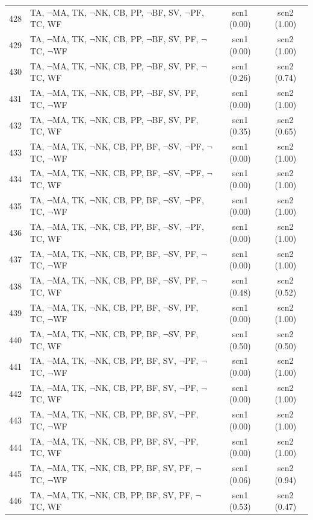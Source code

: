 \documentclass[12pt]{article}
\begin{document}
\begin{longtable}{|l|l|c|c|}
428 & TA, $\neg$MA, TK, $\neg$NK, CB, PP, $\neg$BF, SV, $\neg$PF, TC, WF & scn1 (0.00) & scn2 (1.00)\\
429 & TA, $\neg$MA, TK, $\neg$NK, CB, PP, $\neg$BF, SV, PF, $\neg$TC, $\neg$WF & scn1 (0.00) & scn2 (1.00)\\
430 & TA, $\neg$MA, TK, $\neg$NK, CB, PP, $\neg$BF, SV, PF, $\neg$TC, WF & scn1 (0.26) & scn2 (0.74)\\
431 & TA, $\neg$MA, TK, $\neg$NK, CB, PP, $\neg$BF, SV, PF, TC, $\neg$WF & scn1 (0.00) & scn2 (1.00)\\
432 & TA, $\neg$MA, TK, $\neg$NK, CB, PP, $\neg$BF, SV, PF, TC, WF & scn1 (0.35) & scn2 (0.65)\\
433 & TA, $\neg$MA, TK, $\neg$NK, CB, PP, BF, $\neg$SV, $\neg$PF, $\neg$TC, $\neg$WF & scn1 (0.00) & scn2 (1.00)\\
434 & TA, $\neg$MA, TK, $\neg$NK, CB, PP, BF, $\neg$SV, $\neg$PF, $\neg$TC, WF & scn1 (0.00) & scn2 (1.00)\\
435 & TA, $\neg$MA, TK, $\neg$NK, CB, PP, BF, $\neg$SV, $\neg$PF, TC, $\neg$WF & scn1 (0.00) & scn2 (1.00)\\
436 & TA, $\neg$MA, TK, $\neg$NK, CB, PP, BF, $\neg$SV, $\neg$PF, TC, WF & scn1 (0.00) & scn2 (1.00)\\
437 & TA, $\neg$MA, TK, $\neg$NK, CB, PP, BF, $\neg$SV, PF, $\neg$TC, $\neg$WF & scn1 (0.00) & scn2 (1.00)\\
438 & TA, $\neg$MA, TK, $\neg$NK, CB, PP, BF, $\neg$SV, PF, $\neg$TC, WF & scn1 (0.48) & scn2 (0.52)\\
439 & TA, $\neg$MA, TK, $\neg$NK, CB, PP, BF, $\neg$SV, PF, TC, $\neg$WF & scn1 (0.00) & scn2 (1.00)\\
440 & TA, $\neg$MA, TK, $\neg$NK, CB, PP, BF, $\neg$SV, PF, TC, WF & scn1 (0.50) & scn2 (0.50)\\
441 & TA, $\neg$MA, TK, $\neg$NK, CB, PP, BF, SV, $\neg$PF, $\neg$TC, $\neg$WF & scn1 (0.00) & scn2 (1.00)\\
442 & TA, $\neg$MA, TK, $\neg$NK, CB, PP, BF, SV, $\neg$PF, $\neg$TC, WF & scn1 (0.00) & scn2 (1.00)\\
443 & TA, $\neg$MA, TK, $\neg$NK, CB, PP, BF, SV, $\neg$PF, TC, $\neg$WF & scn1 (0.00) & scn2 (1.00)\\
444 & TA, $\neg$MA, TK, $\neg$NK, CB, PP, BF, SV, $\neg$PF, TC, WF & scn1 (0.00) & scn2 (1.00)\\
445 & TA, $\neg$MA, TK, $\neg$NK, CB, PP, BF, SV, PF, $\neg$TC, $\neg$WF & scn1 (0.06) & scn2 (0.94)\\
446 & TA, $\neg$MA, TK, $\neg$NK, CB, PP, BF, SV, PF, $\neg$TC, WF & scn1 (0.53) & scn2 (0.47)\\

\end{longtable}
\end{document}
